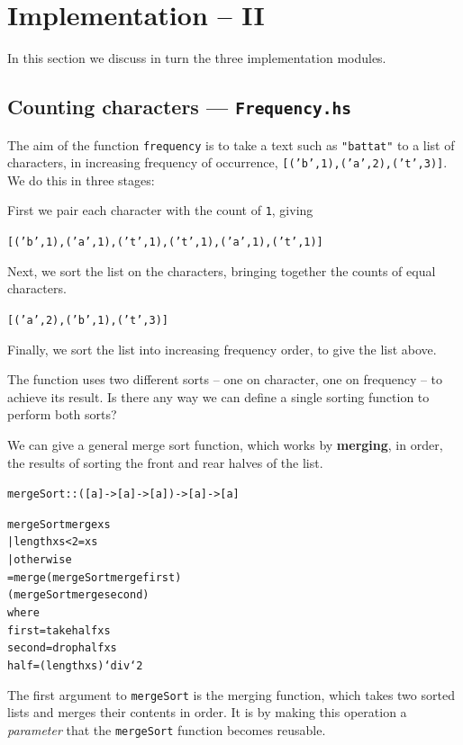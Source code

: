 \section{Implementation -- II}

In this section we discuss in turn the three implementation modules.

\subsection*{Counting characters --- \texttt{Frequency.hs}}

The aim of the function \texttt{frequency} is to take a text such as 
\texttt{"battat"} to a list of characters, in increasing frequency of occurrence,
\texttt{[('b',1),('a',2),('t',3)]}. We do this in three stages:
\begin{titemize}
\item First we pair each character with the count of \texttt{1}, giving
\begin{alltt}
[('b',1),('a',1),('t',1),('t',1),('a',1),('t',1)]
\end{alltt}
\item Next, we sort the list on the characters, bringing together the counts of
equal characters.
\begin{alltt}
[('a',2),('b',1),('t',3)]
\end{alltt}
\item Finally, we sort the list into increasing frequency order, to give the
list above.
\end{titemize}
The function uses two different sorts -- one on character, one on
frequency -- to achieve its result. Is there any way we can define a single
sorting function to perform both sorts? 

We can give a general merge sort
function, which works by \textbf{merging}, in order, the results of sorting the
front and rear halves of the list.
\begin{alltt}
mergeSort :: ([a]->[a]->[a]) -> [a] -> [a]

mergeSort merge xs
  | length xs < 2 	= xs					
  | otherwise		
      = merge (mergeSort merge first)
              (mergeSort merge second)	
        where
        first  = take half xs
        second = drop half xs
        half   = (length xs) `div` 2
\end{alltt}
The first argument to \texttt{mergeSort} is the merging function, which takes
two sorted lists and merges their contents in order. It is by making this
operation a {\em parameter\/} that the \texttt{mergeSort} function becomes
reusable.

